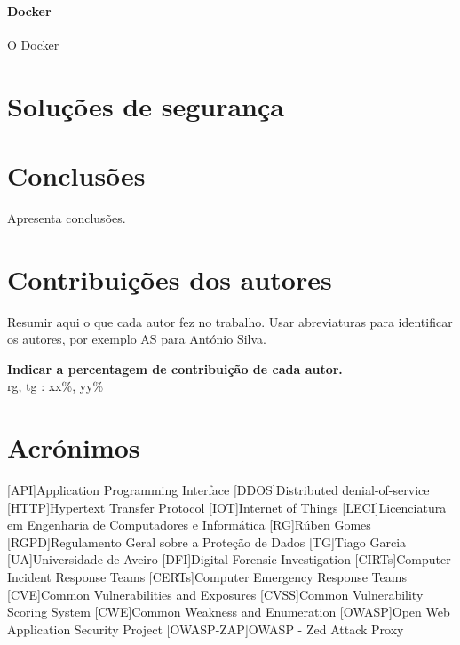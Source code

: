 \documentclass{report}
\begin{document}
\subsubsection{Docker}
\label{subsubsec:docker}
O Docker



\chapter{Soluções de segurança}
\label{ch:solucoes-de-seguranca}

\chapter{Conclusões}
\label{ch:conclusao}
Apresenta conclusões.

\chapter*{Contribuições dos autores}
Resumir aqui o que cada autor fez no trabalho.
Usar abreviaturas para identificar os autores,
por exemplo AS para António Silva.

\vspace{10pt}
\textbf{Indicar a percentagem de contribuição de cada autor.}\\

\ac{rg}, \ac{tg} : xx\%, yy\%\\


\chapter*{Acrónimos}
\begin{acronym}
    [API]{Application Programming Interface}
    [DDOS]{Distributed denial-of-service}
    [HTTP]{Hypertext Transfer Protocol}
    [IOT]{Internet of Things}
    [LECI]{Licenciatura em Engenharia de Computadores e Informática}
    [RG]{Rúben Gomes}
    [RGPD]{Regulamento Geral sobre a Proteção de Dados}
    [TG]{Tiago Garcia}
    [UA]{Universidade de Aveiro}
    [DFI]{Digital Forensic Investigation}
    [CIRTs]{Computer Incident Response Teams}
    [CERTs]{Computer Emergency Response Teams}
    [CVE]{Common Vulnerabilities and Exposures}
    [CVSS]{Common Vulnerability Scoring System}
    [CWE]{Common Weakness and Enumeration}
    [OWASP]{Open Web Application Security Project}
    [OWASP-ZAP]{OWASP - Zed Attack Proxy}
\end{acronym}


\printbibliography
\end{document}
